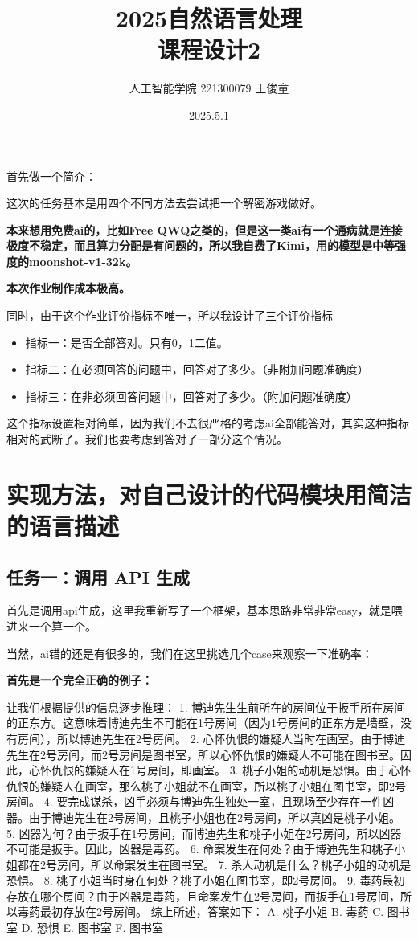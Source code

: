 \documentclass[answers]{exam}  %
\title{2025自然语言处理 \\ 课程设计2}
\date{2025.5.1}
\author{人工智能学院 221300079 王俊童}
\begin{document}
\maketitle

首先做一个简介：

这次的任务基本是用四个不同方法去尝试把一个解密游戏做好。

\textbf{本来想用免费ai的，比如Free QWQ之类的，但是这一类ai有一个通病就是连接极度不稳定，而且算力分配是有问题的，所以我自费了Kimi，用的模型是中等强度的moonshot-v1-32k。}

\textbf{本次作业制作成本极高。}

同时，由于这个作业评价指标不唯一，所以我设计了三个评价指标
\begin{itemize}
    \item 指标一：是否全部答对。只有0，1二值。
    \item 指标二：在必须回答的问题中，回答对了多少。（非附加问题准确度）
    \item 指标三：在非必须回答问题中，回答对了多少。（附加问题准确度）
\end{itemize}
这个指标设置相对简单，因为我们不去很严格的考虑ai全部能答对，其实这种指标相对的武断了。我们也要考虑到答对了一部分这个情况。

\section{实现方法，对自己设计的代码模块用简洁的语言描述}
\subsection{任务一：调用 API 生成}

首先是调用api生成，这里我重新写了一个框架，基本思路非常非常easy，就是喂进来一个算一个。

当然，ai错的还是有很多的，我们在这里挑选几个case来观察一下准确率：

\textbf{首先是一个完全正确的例子：}

让我们根据提供的信息逐步推理： 1. 博迪先生生前所在的房间位于扳手所在房间的正东方。这意味着博迪先生不可能在1号房间（因为1号房间的正东方是墙壁，没有房间），所以博迪先生在2号房间。 2. 心怀仇恨的嫌疑人当时在画室。由于博迪先生在2号房间，而2号房间是图书室，所以心怀仇恨的嫌疑人不可能在图书室。因此，心怀仇恨的嫌疑人在1号房间，即画室。 3. 桃子小姐的动机是恐惧。由于心怀仇恨的嫌疑人在画室，那么桃子小姐就不在画室，所以桃子小姐在图书室，即2号房间。 4. 要完成谋杀，凶手必须与博迪先生独处一室，且现场至少存在一件凶器。由于博迪先生在2号房间，且桃子小姐也在2号房间，所以真凶是桃子小姐。 5. 凶器为何？由于扳手在1号房间，而博迪先生和桃子小姐在2号房间，所以凶器不可能是扳手。因此，凶器是毒药。 6. 命案发生在何处？由于博迪先生和桃子小姐都在2号房间，所以命案发生在图书室。 7. 杀人动机是什么？桃子小姐的动机是恐惧。 8. 桃子小姐当时身在何处？桃子小姐在图书室，即2号房间。 9. 毒药最初存放在哪个房间？由于凶器是毒药，且命案发生在2号房间，而扳手在1号房间，所以毒药最初存放在2号房间。 综上所述，答案如下： A. 桃子小姐 B. 毒药 C. 图书室 D. 恐惧 E. 图书室 F. 图书室
\end{document}
